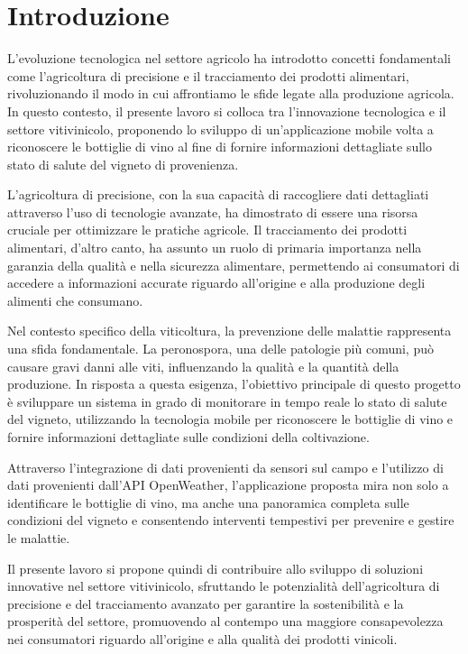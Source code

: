 {}
\chapter*{Introduzione}

L'evoluzione tecnologica nel settore agricolo ha introdotto concetti fondamentali come l'agricoltura di precisione e il tracciamento dei prodotti alimentari, rivoluzionando il modo in cui affrontiamo le sfide legate alla produzione agricola. In questo contesto, il presente lavoro si colloca tra l'innovazione tecnologica e il settore vitivinicolo, proponendo lo sviluppo di un'applicazione mobile volta a riconoscere le bottiglie di vino al fine di fornire informazioni dettagliate sullo stato di salute del vigneto di provenienza.

L'agricoltura di precisione, con la sua capacità di raccogliere dati dettagliati attraverso l'uso di tecnologie avanzate, ha dimostrato di essere una risorsa cruciale per ottimizzare le pratiche agricole. Il tracciamento dei prodotti alimentari, d'altro canto, ha assunto un ruolo di primaria importanza nella garanzia della qualità e nella sicurezza alimentare, permettendo ai consumatori di accedere a informazioni accurate riguardo all'origine e alla produzione degli alimenti che consumano.

Nel contesto specifico della viticoltura, la prevenzione delle malattie rappresenta una sfida fondamentale. La peronospora, una delle patologie più comuni, può causare gravi danni alle viti, influenzando la qualità e la quantità della produzione. In risposta a questa esigenza, l'obiettivo principale di questo progetto è sviluppare un sistema in grado di monitorare in tempo reale lo stato di salute del vigneto, utilizzando la tecnologia mobile per riconoscere le bottiglie di vino e fornire informazioni dettagliate sulle condizioni della coltivazione.

Attraverso l'integrazione di dati provenienti da sensori sul campo e l'utilizzo di dati provenienti dall'API OpenWeather, l'applicazione proposta mira non solo a identificare le bottiglie di vino, ma anche una panoramica completa sulle condizioni del vigneto e consentendo interventi tempestivi per prevenire e gestire le malattie.

Il presente lavoro si propone quindi di contribuire allo sviluppo di soluzioni innovative nel settore vitivinicolo, sfruttando le potenzialità dell'agricoltura di precisione e del tracciamento avanzato per garantire la sostenibilità e la prosperità del settore, promuovendo al contempo una maggiore consapevolezza nei consumatori riguardo all'origine e alla qualità dei prodotti vinicoli.

